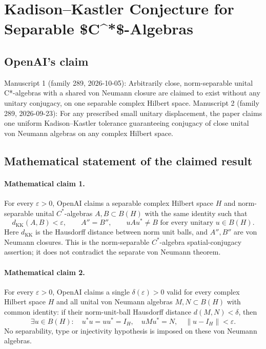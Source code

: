 \documentclass[11pt]{article}
\begin{document}
\section*{Kadison–Kastler Conjecture for Separable \$C\textasciicircum{}*\$-Algebras}

\subsection{OpenAI's claim}
Manuscript 1 (family 289, 2026-10-05): Arbitrarily close, norm-separable unital C*-algebras with a shared von Neumann closure are claimed to exist without any unitary conjugacy, on one separable complex Hilbert space. Manuscript 2 (family 289, 2026-09-23): For any prescribed small unitary displacement, the paper claims one uniform Kadison--Kastler tolerance guaranteeing conjugacy of close unital von Neumann algebras on any complex Hilbert space.

\subsection{Mathematical statement of the claimed result}
\paragraph{Mathematical claim 1.} For every $\varepsilon>0$, OpenAI claims a separable complex Hilbert space $H$ and norm-separable unital $C^*$-algebras $A,B\subset B(H)$ with the same identity such that
\[
d_{\mathrm{KK}}(A,B)<\varepsilon,\qquad A''=B'',\qquad
u Au^*\ne B\text{ for every unitary }u\in B(H).
\]
Here $d_{\mathrm{KK}}$ is the Hausdorff distance between norm unit balls, and $A'',B''$ are von Neumann closures. This is the norm-separable $C^*$-algebra spatial-conjugacy assertion; it does not contradict the separate von Neumann theorem.

\paragraph{Mathematical claim 2.} For every $\varepsilon>0$, OpenAI claims a single $\delta(\varepsilon)>0$ valid for every complex Hilbert space $H$ and all unital von Neumann algebras $M,N\subset B(H)$ with common identity: if their norm-unit-ball Hausdorff distance $d(M,N)<\delta$, then
\[
\exists u\in B(H):\quad u^*u=uu^*=I_H,\quad uMu^*=N,\quad\|u-I_H\|<\varepsilon.
\]
No separability, type or injectivity hypothesis is imposed on these von Neumann algebras.
\end{document}
